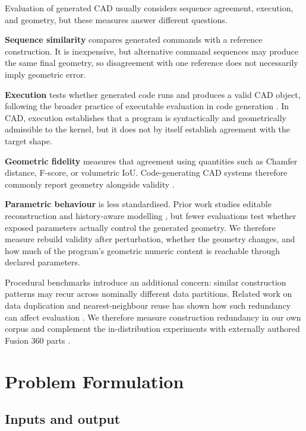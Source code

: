 \documentclass[preprint,12pt]{elsarticle}
\begin{document}
Evaluation of generated CAD usually considers sequence agreement, execution,
and geometry, but these measures answer different questions.

\textbf{Sequence similarity} compares generated commands with a reference
construction. It is inexpensive, but alternative command sequences may produce
the same final geometry, so disagreement with one reference does not
necessarily imply geometric error.

\textbf{Execution} tests whether generated code runs and produces a valid CAD
object, following the broader practice of executable evaluation in code
generation
\cite{chen2021codex,li2022alphacode}. In CAD, execution establishes that a
program is syntactically and geometrically admissible to the kernel, but it
does not by itself establish agreement with the target shape.

\textbf{Geometric fidelity} measures that agreement using quantities such as
Chamfer distance, F-score, or volumetric IoU. Code-generating CAD systems
therefore commonly report geometry alongside validity
\cite{rukhovich2025cadrecode}.

\textbf{Parametric behaviour} is less standardised. Prior work studies
editable reconstruction
\cite{zhang2025ecadnet,kodnongbua2023reparamcad} and history-aware modelling
\cite{dong2026histcad}, but fewer evaluations test whether exposed parameters
actually control the generated geometry. We therefore measure rebuild
validity after perturbation, whether the geometry changes, and how much of the
program's geometric numeric content is reachable through declared parameters.

Procedural benchmarks introduce an additional concern: similar construction
patterns may recur across nominally different data partitions. Related work on
data duplication and nearest-neighbour reuse has shown how such redundancy can
affect evaluation
\cite{lee2022dedup,khandelwal2020knnlm}. We therefore measure construction
redundancy in our own corpus and complement the in-distribution experiments
with externally authored Fusion 360 parts
\cite{willis2021fusion360gallery}.

\section{Problem Formulation}
\label{sec:formulation}

\subsection{Inputs and output}
\label{sec:formulation_io}
\end{document}
